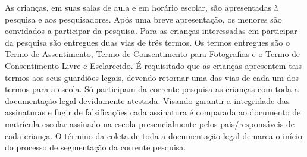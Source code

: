 As crianças, em suas salas de aula e em horário escolar, são apresentadas à pesquisa e aos pesquisadores. Após uma breve apresentação, os menores são convidados a participar da pesquisa. Para as crianças interessadas em participar da pesquisa são entregues duas vias de três termos. Os termos entregues são o Termo de Assentimento, Termo de Consentimento para Fotografias e o Termo de Consentimento Livre e Esclarecido. É requisitado que as crianças apresentem tais termos aos seus guardiões legais, devendo retornar uma das vias de cada um dos termos para a escola. Só participam da corrente pesquisa as crianças com toda a documentação legal devidamente atestada. Visando garantir a integridade das assinaturas e fugir de falsificações cada assinatura é comparada ao documento de matrícula escolar assinado na escola presencialmente pelos pais/responsáveis de cada criança. O término da coleta de toda a documentação legal demarca o início do processo de segmentação da corrente pesquisa. 


